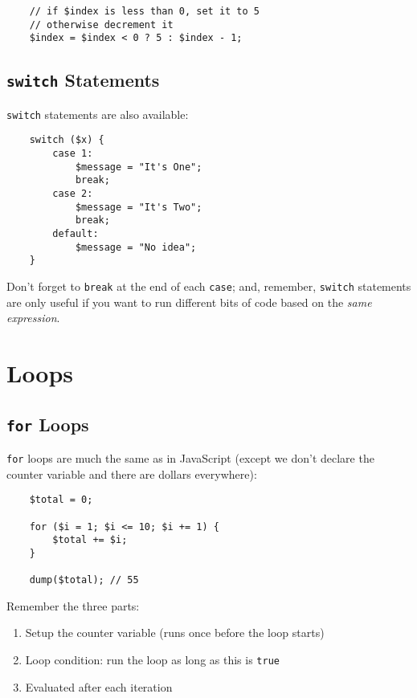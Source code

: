 \begin{verbatim}
    // if $index is less than 0, set it to 5
    // otherwise decrement it
    $index = $index < 0 ? 5 : $index - 1;
\end{verbatim}


\pagebreak


\subsection{\texttt{switch} Statements}

\texttt{switch} statements are also available:

\begin{verbatim}
    switch ($x) {
        case 1:
            $message = "It's One";
            break;
        case 2:
            $message = "It's Two";
            break;
        default:
            $message = "No idea";
    }
\end{verbatim}

Don't forget to \texttt{break} at the end of each \texttt{case}; and, remember, \texttt{switch} statements are only useful if you want to run different bits of code based on the \textit{same expression}.


\section{Loops}

\subsection{\texttt{for} Loops}

\texttt{for} loops are much the same as in JavaScript (except we don't declare the counter variable and there are dollars everywhere):

\begin{verbatim}
    $total = 0;

    for ($i = 1; $i <= 10; $i += 1) {
        $total += $i;
    }

    dump($total); // 55
\end{verbatim}

Remember the three parts:

\begin{enumerate}
    \item Setup the counter variable (runs once before the loop starts)
    \item Loop condition: run the loop as long as this is \texttt{true}
    \item Evaluated after each iteration
\end{enumerate}

